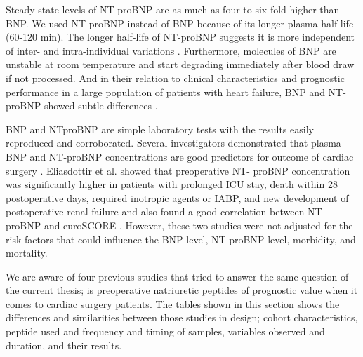 \documentclass[14pt,a4paper,onecolumn]{extarticle}
\begin{document}
Steady-state levels of NT-proBNP are as much as four-to six-fold higher than BNP. We used NT-proBNP instead of BNP because of its longer plasma half-life (60-120 min). The longer half-life of NT-proBNP suggests it is more independent of inter- and intra-individual variations \citep{Clerico2006}. Furthermore, molecules of BNP are unstable at room temperature and start degrading immediately after blood draw if not processed. And in their relation to clinical characteristics and prognostic performance in a large population of patients with heart failure, BNP and NT-proBNP showed subtle differences \citep{Masson2006}.

BNP and NTproBNP are simple laboratory tests with the results easily reproduced and corroborated. Several investigators demonstrated that plasma BNP and NT-proBNP concentrations are good predictors for outcome of cardiac surgery \citep{Hutfless2004}. Eliasdottir et al. showed that preoperative NT- proBNP concentration was significantly higher in patients with prolonged ICU stay, death within 28 postoperative days, required inotropic agents or IABP, and new development of postoperative renal failure and also found a good correlation between NT-proBNP and euroSCORE \citep{Eliasdottir2008}.  However, these two studies were not adjusted for the risk factors that could influence the BNP level, NT-proBNP level, morbidity, and mortality.

We are aware of four previous studies that tried to answer the same question of the current thesis; is preoperative natriuretic peptides of prognostic value when it comes to cardiac surgery patients.  The tables shown in this section shows the differences and similarities between those studies in design; cohort characteristics, peptide used and frequency and timing of samples, variables observed and duration, and their results.
\end{document}
